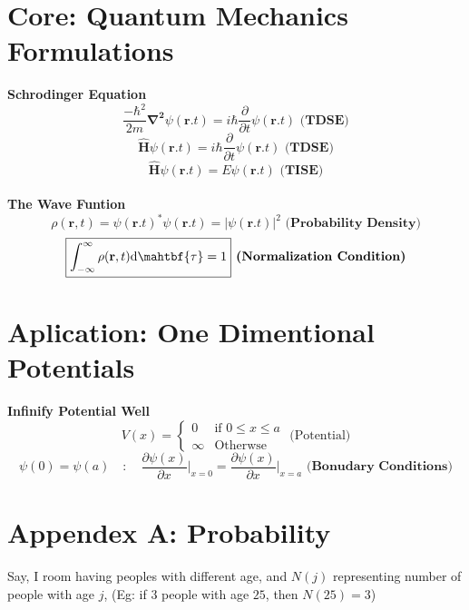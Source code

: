 \documentclass{article}[12pt, a4paper]
\newcommand{\gfrac}[2]{\frac{\displaystyle #1}{\displaystyle #2}}
\begin{document}
\centering \section*{Core: Quantum Mechanics Formulations}

\textbf{Schrodinger Equation}
$$\boxed{\frac{-\hbar^2}{2m} \mathbf{\nabla^2} \psi(\mathbf{r}.t) = i\hbar \frac{\partial}{\partial t} \psi(\mathbf{r}.t)} \textbf{ (TDSE)}$$
$$\boxed{\hat{\mathbf{H}} \psi(\mathbf{r}.t) = i\hbar \frac{\partial}{\partial t} \psi(\mathbf{r}.t)} \textbf{ (TDSE)}$$
$$\boxed{\hat{\mathbf{H}} \psi(\mathbf{r}.t) = E \psi(\mathbf{r}.t)} \textbf{ (TISE)}$$ \\

\textbf{The Wave Funtion}
$$\boxed{\rho (\mathbf{r}, t) = \psi(\mathbf{r}.t)^\mathbf{*} \psi(\mathbf{r}.t) =  {|\psi(\mathbf{r}.t)|}^2} \textbf{ (Probability Density)}$$
$$\boxed{ \int_{-\infty}^{\infty} \rho (\mathbf{r}, t) \mathrm{d}\mahtbf{\tau} = 1} \textbf{ (Normalization Condition)}$$

\centering \section*{Aplication: One Dimentional Potentials}

\textbf{Infinify Potential Well}
$$
\boxed{
V(x) =
\begin{cases}
	0 & \text{if } 0 \le x \le a \\
	\infty & \text{Otherwse}
\end{cases}
} \text{ (Potential)}
$$
$$
\boxed{
\psi(0) = \psi (a) \quad : \quad
\gfrac{\partial \psi(x)}{\partial x}\big|_{x=0} = \gfrac{\partial \psi(x)}{\partial x}\big|_{x=a}
} \textbf{ (Bonudary Conditions)}
$$
$$
\boxed{}
$$

\section*{Appendex A: Probability}
Say, I room having peoples with different age, and $N(j)$ representing number of people with age $j$,
(Eg: if $3$ people with age $25$, then $N(25) = 3$)
\end{document}
